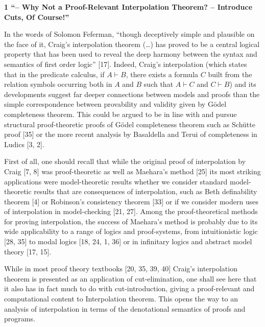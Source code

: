 
 
\par\medskip\noindent\textbf{1 “– Why Not a Proof-Relevant Interpolation Theorem?  – Introduce Cuts, Of Course!”}\par
 
 
In the words of Solomon Feferman, “though deceptively simple and plausible on the face of it, Craig’s interpolation theorem (…) has proved to be a central logical property that has been used to reveal the deep harmony between the syntax and semantics of first order logic” [17]. Indeed, Craig’s interpolation (which states that in the predicate calculus, if $A\vdash B$, there exists a formula $C$ built from the relation symbols occurring both in $A$ and $B$ such that $A\vdash C$ and $C\vdash B$) and its developments suggest far deeper connections between models and proofs than the simple correspondence between provability and validity given by Gödel completeness theorem. This could be argued to be in line with and pursue structural proof-theoretic proofs of Gödel completeness theorem such as Schütte proof [35] or the more recent analysis by Basaldella and Terui of completeness in Ludics [3, 2].\par
 
 
 
First of all, one should recall that while the original proof of interpolation by Craig [7, 8] was proof-theoretic as well as Maehara’s method [25] its most striking applications were model-theoretic results whether we consider standard model-theoretic results that are consequences of interpolation, such as Beth definability theorem [4] or Robinson’s consistency theorem [33] or if we consider modern uses of interpolation in model-checking [21, 27]. Among the proof-theoretical methods for proving interpolation, the success of Maehara’s method is probably due to its wide applicability to a range of logics and proof-systems, from intuitionistic logic [28, 35] to modal logics [18, 24, 1, 36] or in infinitary logics and abstract model theory [17, 15].\par
 
 
 
While in most proof theory textbooks [20, 35, 39, 40] Craig’s interpolation theorem is presented as an application of cut-elimination, one shall see here that it also has in fact much to do with cut-introduction, giving a proof-relevant and computational content to Interpolation theorem. This opens the way to an analysis of interpolation in terms of the denotational semantics of proofs and programs.\par
 
